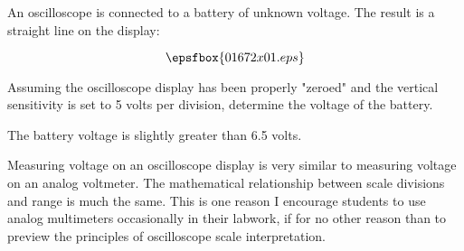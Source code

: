 

An oscilloscope is connected to a battery of unknown voltage.  The result is a straight line on the display:

$$\epsfbox{01672x01.eps}$$

Assuming the oscilloscope display has been properly "zeroed" and the vertical sensitivity is set to 5 volts per division, determine the voltage of the battery.







The battery voltage is slightly greater than 6.5 volts.







Measuring voltage on an oscilloscope display is very similar to measuring voltage on an analog voltmeter.  The mathematical relationship between scale divisions and range is much the same.  This is one reason I encourage students to use analog multimeters occasionally in their labwork, if for no other reason than to preview the principles of oscilloscope scale interpretation.




